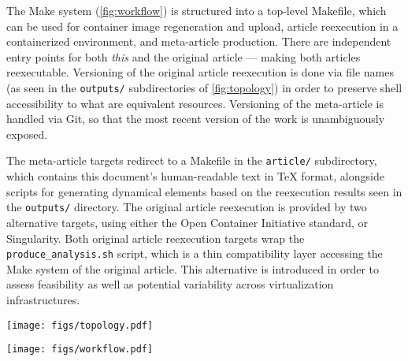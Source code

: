 The Make system (\cref{fig:workflow}) is structured into a top-level Makefile, which can be used for container image regeneration and upload, article reexecution in a containerized environment, and meta-article production.
There are independent entry points for both \emph{this} and the original article — making both articles reexecutable.
Versioning of the original article reexecution is done via file names (as seen in the \texttt{outputs/} subdirectories of \cref{fig:topology}) in order to preserve shell accessibility to what are equivalent resources.
Versioning of the meta-article is handled via Git, so that the most recent version of the work is unambiguously exposed.

The meta-article targets redirect to a Makefile in the \texttt{article/} subdirectory, which contains this document's human-readable text in \TeX{} format, alongside scripts for generating dynamical elements based on the reexecution results seen in the \texttt{outputs/} directory.
The original article reexecution is provided by two alternative targets, using either the Open Container Initiative standard, or Singularity.
Both original article reexecution targets wrap the \texttt{produce\_analysis.sh} script, which is a thin compatibility layer accessing the Make system of the original article.
This alternative is introduced in order to assess feasibility as well as potential variability across virtualization infrastructures.


\begin{figure*}
	\centering
	\texttt{[image: figs/topology.pdf]}
	\caption{
		\textbf{The directory topology of the reexecution repository \cite{me}, highlighting Git submodules.}
		Depicted is the directory tree topology of the repository coordinating OPFVTA reexecution.
		Nested directories are represented by nested boxes, and Git submodules are highlighted in orange.
		The article reexecution PDF results are highlighted in light green, and the PDF of the resulting meta-article (i.e. this article) is highlighted in light blue.
	}
	\label{fig:topology}
\end{figure*}


\begin{figure*}
	\centering
	\texttt{[image: figs/workflow.pdf]}
	\caption{
		\textbf{The reexecution system encompasses both the Original Article and Meta-Article as independent Make targets.}
		Depicted is the reexecution system workflow, with two reexecution entry points, the “Original Article and the “Meta-Article” (i.e. \textit{this} article, which also performs the reproduction assessment).
		Notably, for the generation of the meta-article, the Original Article can be executed, or not — the meta-article will dynamically include all reexecution results which are published, as well as all which are locally produced.
		The article reexecution PDF results are highlighted in light green, and the PDF of the resulting meta-article (i.e. this article) is highlighted in light blue.
		Optional nodes (such as fetching a container image for meta-article reexecution) are faded gray.
	}
	\label{fig:workflow}
\end{figure*}


